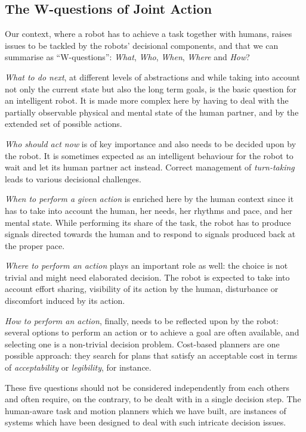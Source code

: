 \documentclass[preprint,3p,times]{elsarticle}
\begin{document}
\subsection{The W-questions of Joint Action}

Our context, where a robot has to achieve a task together with
humans, raises issues to be tackled by the robots' decisional components, and
that we can summarise as ``W-questions'': \emph{What}, \emph{Who}, \emph{When},
\emph{Where} and \emph{How}?

\emph{What to do next}, at different levels of abstractions and while taking
into account not only the current state but also the long term goals, is the
basic question for an intelligent robot. It is made more complex here by having
to deal with the partially observable physical and mental state of the human
partner, and by the extended set of possible actions.

\emph{Who should act now} is of key importance and also needs to be
decided upon by the robot. It is sometimes expected as an intelligent behaviour
for the robot to wait and let its human partner act instead. Correct management
of \emph{turn-taking} leads to various decisional challenges.

\emph{When to perform a given action} is enriched here by the human context
since it has to take into account the human, her needs, her rhythms and
pace, and her mental state. While performing its share of the task, the
robot has to produce signals directed towards the human and to respond to
signals produced back at the proper pace.

\emph{Where to perform an action} plays an important role as well: the choice is
not trivial and might need elaborated decision. The robot is expected to take
into account effort sharing, visibility of its action by the human, disturbance
or discomfort induced by its action.

\emph{How to perform an action}, finally, needs to be reflected upon by the
robot: several options to perform an action or to achieve a goal are often
available, and selecting one is a non-trivial decision problem. Cost-based
planners are one possible approach: they search for plans that satisfy an
acceptable cost in terms of \emph{acceptability} or \emph{legibility}, for
instance.

These five questions should not be considered independently from each others and
often require, on the contrary, to be dealt with in a single decision step. The
human-aware task and motion planners which we have built, are instances of
systems which have been designed to deal with such intricate decision issues.
\end{document}
